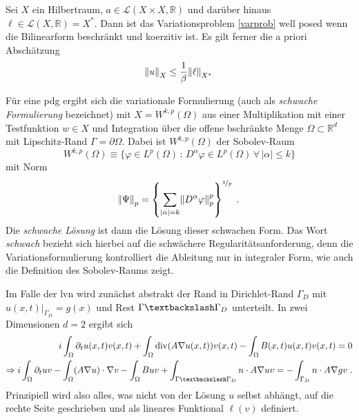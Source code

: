 \begin{satz}\label{laxmilgram}
  Sei $X$ ein Hilbertraum, $a \in \mathcal{L}(X\times X, \mathbb{R})$ und darüber hinaus ${\ell\in\mathcal{L}(X,\mathbb{R})=X^*}$. Dann ist das Variationsproblem \ref{varprob} well posed wenn die Bilinearform beschränkt und koerzitiv ist. Es gilt ferner die a priori Abschätzung
  \begin{equation}
    \norm{u}_X \leq \frac{1}{\beta} \norm{\ell}_{X^*}
  \end{equation}
\end{satz}
 Für eine \ac{pdg} ergibt sich die variationale Formulierung (auch als \emph{schwache Formulierung} bezeichnet) mit ${X=W^{k,p}(\Omega)}$ aus einer Multiplikation mit einer Testfunktion ${w\in X}$ und Integration über die offene bschränkte Menge ${\Omega \subset \mathbb{R}^d}$ mit Lipschitz-Rand $\Gamma = \partial\Omega$.
 Dabei ist ${W^{k,p}(\Omega)}$ der Sobolev-Raum
 \begin{equation*}
   W^{k,p}(\Omega) \equiv \{ \varphi \in L^p(\Omega) \, : \, D^{\alpha}\varphi \in L^p(\Omega) \, \forall \, |\alpha| \leq k\}
 \end{equation*}
 mit Norm
 \begin{equation*}
   \norm{\Psi}_p = \left\{ \sum_{|\alpha|=k}\norm{D^{\alpha}\varphi}_p^p\right\}^{\nicefrac{1}{p}} \; .
 \end{equation*}
 Die \emph{schwache Lösung} ist dann die Lösung dieser schwachen Form. Das Wort \emph{schwach} bezieht sich hierbei auf die schwächere Regularitätsanforderung, denn die Variationsformulierung kontrolliert die Ableitung nur in integraler Form, wie auch die Definition des Sobolev-Raums zeigt.

 Im Falle der \ac{lvn} wird zunächst abstrakt der Rand in Dirichlet-Rand $\Gamma_D$ mit ${u(x,t)|_{\Gamma_D} = g(x)}$ und Rest ${\Gamma\textbackslash\Gamma_D}$ unterteilt. In zwei Dimensionen $d=2$ ergibt sich
 \begin{align*}
              i \int_{\Omega} \partial_t u(x,t) v(x,t) + \int_{\Omega}\operatorname{div}(A\nabla u(x,t)) v(x,t) - \int_{\Omega}B(x,t) u(x,t) v(x,t) = 0 \\
  \Rightarrow i \int_{\Omega} \partial_t u v - \int_{\Omega}(A\nabla u)\cdot\nabla v - \int_{\Omega}B u v + \int_{\Gamma\textbackslash\Gamma_D} n \cdot A\nabla u v = - \int_{\Gamma_D} n \cdot A\nabla g v \; .
\end{align*}
 Prinzipiell wird also alles, was nicht von der Lösung $u$ selbst abhängt, auf die rechte Seite geschrieben und als lineares Funktional $\ell(v)$ definiert.

